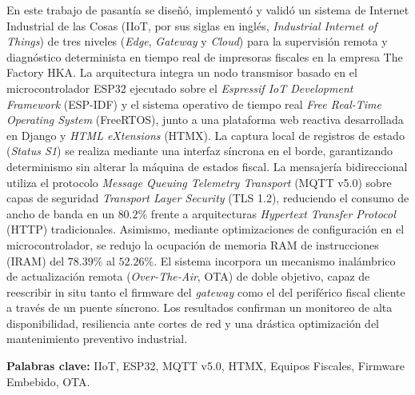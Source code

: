 \documentclass[pregrado]{tesis-usb}
\numberwithin{algorithm}{chapter} %
\begin{document}
    \frontmatter
    \maketitle
    
    
    
\begin{resumen}
En este trabajo de pasantía se diseñó, implementó y validó un sistema de Internet Industrial de las Cosas (IIoT, por sus siglas en inglés, \textit{Industrial Internet of Things}) de tres niveles (\textit{Edge}, \textit{Gateway} y \textit{Cloud}) para la supervisión remota y diagnóstico determinista en tiempo real de impresoras fiscales en la empresa The Factory HKA. La arquitectura integra un nodo transmisor basado en el microcontrolador ESP32 ejecutado sobre el \textit{Espressif IoT Development Framework} (ESP-IDF) y el sistema operativo de tiempo real \textit{Free Real-Time Operating System} (FreeRTOS), junto a una plataforma web reactiva desarrollada en Django y \textit{HTML eXtensions} (HTMX). La captura local de registros de estado (\textit{Status S1}) se realiza mediante una interfaz síncrona en el borde, garantizando determinismo sin alterar la máquina de estados fiscal. La mensajería bidireccional utiliza el protocolo \textit{Message Queuing Telemetry Transport} (MQTT v5.0) sobre capas de seguridad \textit{Transport Layer Security} (TLS 1.2), reduciendo el consumo de ancho de banda en un $80.2\%$ frente a arquitecturas \textit{Hypertext Transfer Protocol} (HTTP) tradicionales. Asimismo, mediante optimizaciones de configuración en el microcontrolador, se redujo la ocupación de memoria RAM de instrucciones (IRAM) del $78.39\%$ al $52.26\%$. El sistema incorpora un mecanismo inalámbrico de actualización remota (\textit{Over-The-Air}, OTA) de doble objetivo, capaz de reescribir in situ tanto el firmware del \textit{gateway} como el del periférico fiscal cliente a través de un puente síncrono. Los resultados confirman un monitoreo de alta disponibilidad, resiliencia ante cortes de red y una drástica optimización del mantenimiento preventivo industrial.

\vspace{0.5cm}
\noindent \textbf{Palabras clave:} IIoT, ESP32, MQTT v5.0, HTMX, Equipos Fiscales, Firmware Embebido, OTA.
\end{resumen}
    \tableofcontents
    \listoffigures
    \listoftables
    \useacronyms
    
    
    \mainmatter
    
    
    
    
    
    \nocite{*}
    
    \appendix
    
\end{document}
